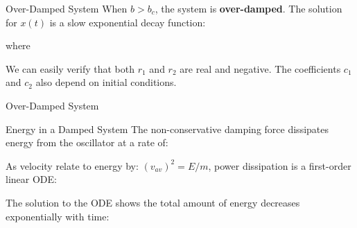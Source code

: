 \documentclass[12pt,compress,aspectratio=169]{beamer}
\begin{document}
\begin{frame}{Over-Damped System}
  When $b>b_c$, the system is \textbf{over-damped}. The solution for $x(t)$ is
  a slow exponential decay function:


  where


  We can easily verify that both $r_1$ and $r_2$ are real and negative. The
  coefficients $c_1$ and $c_2$ also depend on initial conditions. 
\end{frame}


\begin{frame}{Over-Damped System}
  \centering
\end{frame}



\begin{frame}{Energy in a Damped System}
  The non-conservative damping force dissipates energy from the oscillator at
  a rate of:


  As velocity relate to energy by: $(v_{av})^2=E/m$, power dissipation is a
  first-order linear ODE:


  The solution to the ODE shows the total amount of energy decreases
  exponentially with time:

\end{frame}
\end{document}
